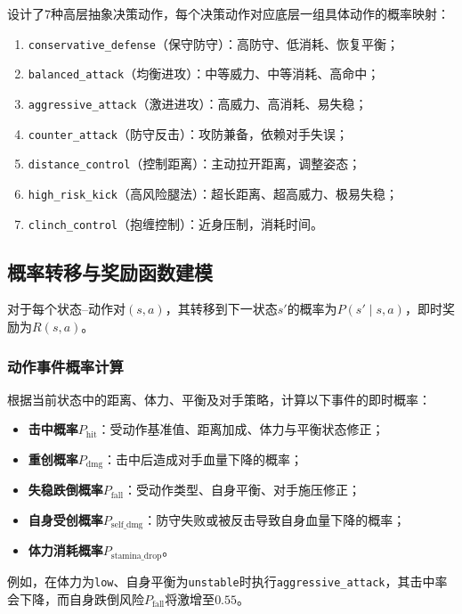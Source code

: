 \documentclass[a4paper,12pt]{article}
\numberwithin{equation}{section}
\numberwithin{table}{section}
\numberwithin{figure}{section}
\begin{document}
设计了7种高层抽象决策动作，每个决策动作对应底层一组具体动作的概率映射：
\begin{enumerate}
    \item \texttt{conservative\_defense}（保守防守）：高防守、低消耗、恢复平衡；
    \item \texttt{balanced\_attack}（均衡进攻）：中等威力、中等消耗、高命中；
    \item \texttt{aggressive\_attack}（激进进攻）：高威力、高消耗、易失稳；
    \item \texttt{counter\_attack}（防守反击）：攻防兼备，依赖对手失误；
    \item \texttt{distance\_control}（控制距离）：主动拉开距离，调整姿态；
    \item \texttt{high\_risk\_kick}（高风险腿法）：超长距离、超高威力、极易失稳；
    \item \texttt{clinch\_control}（抱缠控制）：近身压制，消耗时间。
\end{enumerate}

\subsection{概率转移与奖励函数建模}

对于每个状态--动作对$(s, a)$，其转移到下一状态$s'$的概率为$P(s' \mid s, a)$，即时奖励为$R(s, a)$。

\subsubsection{动作事件概率计算}

根据当前状态中的距离、体力、平衡及对手策略，计算以下事件的即时概率：
\begin{itemize}
    \item \textbf{击中概率}$P_{\text{hit}}$：受动作基准值、距离加成、体力与平衡状态修正；
    \item \textbf{重创概率}$P_{\text{dmg}}$：击中后造成对手血量下降的概率；
    \item \textbf{失稳跌倒概率}$P_{\text{fall}}$：受动作类型、自身平衡、对手施压修正；
    \item \textbf{自身受创概率}$P_{\text{self\_dmg}}$：防守失败或被反击导致自身血量下降的概率；
    \item \textbf{体力消耗概率}$P_{\text{stamina\_drop}}$。
\end{itemize}
例如，在体力为\texttt{low}、自身平衡为\texttt{unstable}时执行\texttt{aggressive\_attack}，其击中率会下降，而自身跌倒风险$P_{\text{fall}}$将激增至$0.55$。
\end{document}
